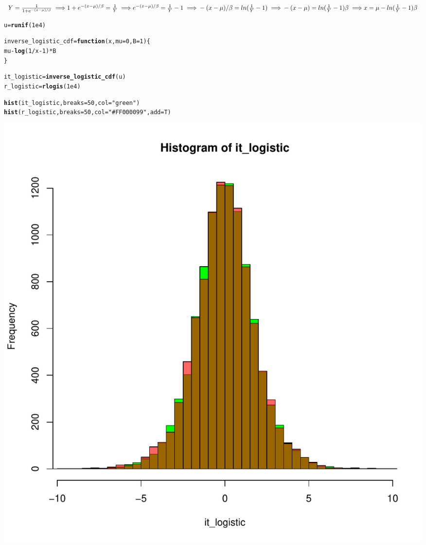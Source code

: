 \documentclass{article}\usepackage[]{graphicx}\usepackage[]{color}
\makeatletter
\newcommand{\hlnum}[1]{\textcolor[rgb]{0.686,0.059,0.569}{#1}}%
\newcommand{\hlstr}[1]{\textcolor[rgb]{0.192,0.494,0.8}{#1}}%
\newcommand{\hlopt}[1]{\textcolor[rgb]{0,0,0}{#1}}%
\newcommand{\hlstd}[1]{\textcolor[rgb]{0.345,0.345,0.345}{#1}}%
\newcommand{\hlkwa}[1]{\textcolor[rgb]{0.161,0.373,0.58}{\textbf{#1}}}%
\newcommand{\hlkwb}[1]{\textcolor[rgb]{0.69,0.353,0.396}{#1}}%
\newcommand{\hlkwc}[1]{\textcolor[rgb]{0.333,0.667,0.333}{#1}}%
\newcommand{\hlkwd}[1]{\textcolor[rgb]{0.737,0.353,0.396}{\textbf{#1}}}%
\newenvironment{kframe}{%
 \def\at@end@of@kframe{}%
 \ifinner\ifhmode%
  \def\at@end@of@kframe{\end{minipage}}%
  \begin{minipage}{\columnwidth}%
 \fi\fi%
 \def\FrameCommand##1{\hskip\@totalleftmargin \hskip-\fboxsep
 \colorbox{shadecolor}{##1}\hskip-\fboxsep
     \hskip-\linewidth \hskip-\@totalleftmargin \hskip\columnwidth}%
 \MakeFramed {\advance\hsize-\width
   \@totalleftmargin\z@ \linewidth\hsize
   \@setminipage}}%
 {\par\unskip\endMakeFramed%
 \at@end@of@kframe}
\newenvironment{knitrout}{}{} %
\makeatother
\begin{document}
$Y = \frac{1}{1+e^{-(x-\mu)/\beta}} \implies\\
1+e^{-(x-\mu)/\beta} = \frac{1}{Y} \implies\\
e^{-(x-\mu)/\beta} = \frac{1}{Y} - 1 \implies\\
-(x-\mu)/\beta = ln(\frac{1}{Y} - 1) \implies\\
-(x-\mu) = ln(\frac{1}{Y} - 1)\beta \implies\\
x = \mu - ln(\frac{1}{Y} - 1)\beta$
\begin{knitrout}
\color{fgcolor}\begin{kframe}
\begin{alltt}
\hlstd{u} \hlkwb{=} \hlkwd{runif}\hlstd{(}\hlnum{1e4}\hlstd{)}

\hlstd{inverse_logistic_cdf} \hlkwb{=} \hlkwa{function}\hlstd{(}\hlkwc{x}\hlstd{,} \hlkwc{mu} \hlstd{=} \hlnum{0} \hlstd{,} \hlkwc{B} \hlstd{=} \hlnum{1}\hlstd{)\{}
  \hlstd{mu} \hlopt{-} \hlkwd{log}\hlstd{(}\hlnum{1}\hlopt{/}\hlstd{x}\hlopt{-}\hlnum{1}\hlstd{)}\hlopt{*}\hlstd{B}
\hlstd{\}}

\hlstd{it_logistic} \hlkwb{=} \hlkwd{inverse_logistic_cdf}\hlstd{(u)}
\hlstd{r_logistic} \hlkwb{=} \hlkwd{rlogis}\hlstd{(}\hlnum{1e4}\hlstd{)}

\hlkwd{hist}\hlstd{(it_logistic,} \hlkwc{breaks} \hlstd{=} \hlnum{50}\hlstd{,} \hlkwc{col} \hlstd{=} \hlstr{"green"}\hlstd{)}
\hlkwd{hist}\hlstd{(r_logistic,} \hlkwc{breaks} \hlstd{=} \hlnum{50}\hlstd{,} \hlkwc{col} \hlstd{=} \hlstr{"#FF000099"}\hlstd{,} \hlkwc{add} \hlstd{= T)}
\end{alltt}
\end{kframe}
\includegraphics[width=0.50\linewidth]{figure/unnamed-chunk-2-1} 

\end{knitrout}
\end{document}
